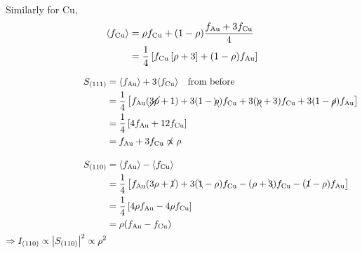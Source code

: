 \begin{parts}
\begin{subparts}
		Similarly for Cu,
		\begin{align*}
			\langle f_\textnormal{Cu} \rangle &= \rho f_\textnormal{Cu} + (1-\rho) \frac{f_\textnormal{Au} + 3f_\textnormal{Cu}}{4} \\
			&= \frac{1}{4} \left[f_\textnormal{Cu} \left[\rho + 3\right] + (1-\rho)f_\textnormal{Au}\right]
		\end{align*}
		
		\subpart
		\begin{align*}
			S_{(111)} &= \langle f_\textnormal{Au} \rangle + 3 \langle f_\textnormal{Cu} \rangle \textnormal{\hspace{1em}from before} \\
			&= \frac{1}{4} \left[f_\textnormal{Au} (\cancel{3\rho} + 1) + 3(1-\bcancel{\rho}) f_\textnormal{Cu} + 3(\bcancel{\rho} + 3) f_\textnormal{Cu} + 3(1-\cancel{\rho}) f_\textnormal{Au}\right] \\
			&= \frac{1}{4} \left[4f_\textnormal{Au} + 12f_\textnormal{Cu}\right] \\
			&= f_\textnormal{Au} + 3f_\textnormal{Cu} \not\propto \rho \\[1em]
			S_{(110)} &= \left\langle{}f_\textnormal{Au}{}\right\rangle - \left\langle{}f_\textnormal{Cu}{}\right\rangle \\
			&= \frac{1}{4} \left[f_\textnormal{Au} (3\rho + \cancel{1}) + 3(\bcancel{1}-\rho) f_\textnormal{Cu} - (\rho + \bcancel{3}) f_\textnormal{Cu} - (\cancel{1}-\rho) f_\textnormal{Au}\right] \\
			&= \frac{1}{4} \left[4\rho f_\textnormal{Au} - 4\rho f_\textnormal{Cu}\right] \\
			&= \rho (f_\textnormal{Au} - f_\textnormal{Cu}) \\
			\Rightarrow I_{(110)} \propto \left|S_{(110)}\right|^2 \propto \rho^2
		\end{align*}
	\end{subparts}
\end{parts}